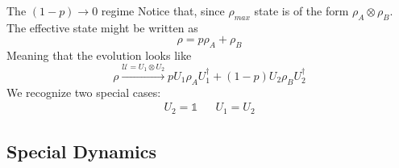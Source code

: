 \documentclass{cubeamer}
\newcommand{\mcU}{\mathcal{U}}
\newcommand{\Id}{\mathds{1}}%
\begin{document}
\begin{frame}{The $(1-p)\rightarrow 0$ regime}
    Notice that, since $\rho_{max}$ state is of the form $\rho_{A}\otimes\rho_{B}$. The effective state might be written as 
    \begin{equation*}
        \rho=p\rho_{A}+\rho_{B}
    \end{equation*}
    Meaning that the evolution looks like
    \begin{equation*}
        \rho\xrightarrow{\mcU=U_{1}\otimes U_{2}} pU_{1}\rho_{A}U_{1}^{\dag}+(1-p)U_{2}\rho_{B}U_{2}^{\dag}
    \end{equation*}
    We recognize two special cases:
    \begin{align*}
        U_{2}=\Id&&U_{1}=U_{2}
    \end{align*}
\end{frame}

\subsection{Special Dynamics}
\end{document}
